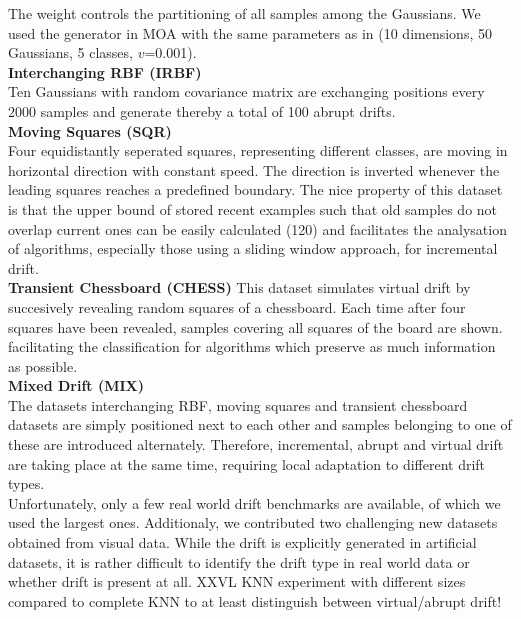 \documentclass[conference]{IEEEtran}
\begin{document}
The weight controls the partitioning of all samples among the Gaussians.
We used the generator in MOA with the same parameters as in \cite{Bifet:2013:EDS:2480362.2480516} (10 dimensions, 50 Gaussians, 5 classes, $v$=0.001).\\ 
\textbf{Interchanging RBF (IRBF)}\\
Ten Gaussians with random covariance matrix are exchanging positions every $2000$ samples and generate thereby a total of 100 abrupt drifts.\\ 
\textbf{Moving Squares (SQR)}\\
Four equidistantly seperated squares, representing different classes, are moving in horizontal direction with constant speed. The direction is inverted whenever the leading squares reaches a predefined boundary.
The nice property of this dataset is that the upper bound of stored recent examples such that old samples do not overlap current ones can be easily calculated (120) and  
facilitates the analysation of algorithms, especially those using a sliding window approach, for incremental drift.\\
\textbf{Transient Chessboard (CHESS)}
This dataset simulates virtual drift by succesively revealing random squares of a chessboard. Each time after four squares have been revealed, samples covering all squares of the board are shown.
facilitating the classification for algorithms which preserve as much information as possible.\\ 
\textbf{Mixed Drift (MIX)} \\
The datasets interchanging RBF, moving squares and transient chessboard datasets are simply positioned next to each other and samples belonging to one of these are introduced alternately.
Therefore, incremental, abrupt and virtual drift are taking place at the same time, requiring local adaptation to different drift types.\\

Unfortunately, only a few real world drift benchmarks are available, of which we used the largest ones. Additionaly, we contributed two challenging new datasets obtained from visual data.
While the drift is explicitly generated in artificial datasets, it is rather difficult to identify the drift type in real world data or whether drift is present at all.
XXVL KNN experiment with different sizes compared to complete KNN to at least distinguish between virtual/abrupt drift!
\end{document}

